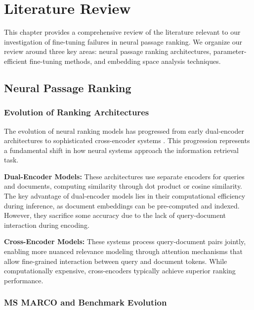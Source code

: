 
\chapter{Literature Review} %

\label{Chapter2} %


This chapter provides a comprehensive review of the literature relevant to our investigation of fine-tuning failures in neural passage ranking. We organize our review around three key areas: neural passage ranking architectures, parameter-efficient fine-tuning methods, and embedding space analysis techniques.

\section{Neural Passage Ranking}

\subsection{Evolution of Ranking Architectures}

The evolution of neural ranking models has progressed from early dual-encoder architectures \cite{dong2022exploring} to sophisticated cross-encoder systems \cite{lu2025crossencoder, karpukhin2020dense}. This progression represents a fundamental shift in how neural systems approach the information retrieval task.

\textbf{Dual-Encoder Models:} These architectures use separate encoders for queries and documents, computing similarity through dot product or cosine similarity. The key advantage of dual-encoder models lies in their computational efficiency during inference, as document embeddings can be pre-computed and indexed. However, they sacrifice some accuracy due to the lack of query-document interaction during encoding.

\textbf{Cross-Encoder Models:} These systems process query-document pairs jointly, enabling more nuanced relevance modeling through attention mechanisms \cite{vaswani2017attention} that allow fine-grained interaction between query and document tokens. While computationally expensive, cross-encoders typically achieve superior ranking performance.

\subsection{MS MARCO and Benchmark Evolution}

